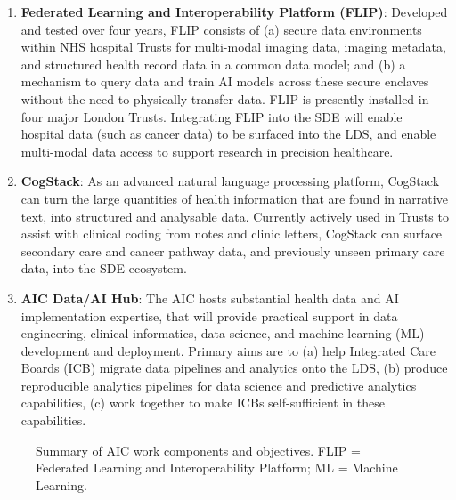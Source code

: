 \documentclass[
  letterpaper,
  DIV=11,
  numbers=noendperiod]{scrartcl}
\begin{document}
\begin{enumerate}
\def\labelenumi{(\arabic{enumi})}
\item
  \textbf{Federated Learning and Interoperability Platform (FLIP)}:
  Developed and tested over four years, FLIP consists of (a) secure data
  environments within NHS hospital Trusts for multi-modal imaging data,
  imaging metadata, and structured health record data in a common data
  model; and (b) a mechanism to query data and train AI models across
  these secure enclaves without the need to physically transfer data.
  FLIP is presently installed in four major London Trusts. Integrating
  FLIP into the SDE will enable hospital data (such as cancer data) to
  be surfaced into the LDS, and enable multi-modal data access to
  support research in precision healthcare.
\item
  \textbf{CogStack}: As an advanced natural language processing
  platform, CogStack can turn the large quantities of health information
  that are found in narrative text, into structured and analysable data.
  Currently actively used in Trusts to assist with clinical coding from
  notes and clinic letters, CogStack can surface secondary care and
  cancer pathway data, and previously unseen primary care data, into the
  SDE ecosystem.
\item
  \textbf{AIC Data/AI Hub}: The AIC hosts substantial health data and AI
  implementation expertise, that will provide practical support in data
  engineering, clinical informatics, data science, and machine learning
  (ML) development and deployment. Primary aims are to (a) help
  Integrated Care Boards (ICB) migrate data pipelines and analytics onto
  the LDS, (b) produce reproducible analytics pipelines for data science
  and predictive analytics capabilities, (c) work together to make ICBs
  self-sufficient in these capabilities.
\end{enumerate}

\begin{figure}


\caption{\label{fig-aic-objectives}Summary of AIC work components and
objectives. FLIP = Federated Learning and Interoperability Platform; ML
= Machine Learning.}

\end{figure}%
\end{document}
